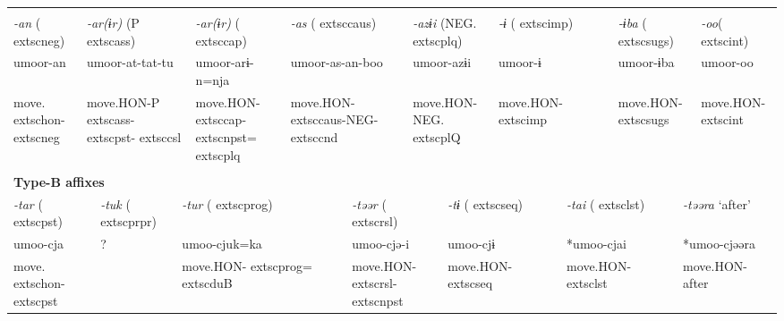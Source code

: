 \tabletail{}
\tablelasttail{}
\begin{tabularx}{\textwidth}{XXXXXXXXXXXXXXXXXXXX}
\lsptoprule
\multicolumn{20}{X}{{\bfseries Type-A affixes}}\\
\multicolumn{2}{X}{{ \textit{{}-an} (	extsc{neg})}} & \multicolumn{5}{X}{{ \textit{{}-ar(ɨr)} (P	extsc{ass})}} & \multicolumn{2}{X}{{ \textit{{}-ar(ɨr)} (	extsc{cap})}} & \multicolumn{3}{X}{{ \textit{{}-as} (	extsc{caus})}} & \multicolumn{3}{X}{{ \textit{{}-azɨi} (NEG.	extsc{plq})}} & \multicolumn{2}{X}{{ \textit{{}-ɨ} (	extsc{imp})}} & \multicolumn{2}{X}{{ \textit{{}-ɨba} (	extsc{sugs})}} & { \textit{{}-oo}(	extsc{int})}\\
\multicolumn{2}{X}{{ umoor-an}} & \multicolumn{5}{X}{{ umoor-at-tat-tu}} & \multicolumn{2}{X}{{ umoor-arɨ-n=nja}} & \multicolumn{3}{X}{{ umoor-as-an-boo}} & \multicolumn{3}{X}{{ umoor-azɨi}} & \multicolumn{2}{X}{{ umoor-ɨ}} & \multicolumn{2}{X}{{ umoor-ɨba}} & { umoor-oo}\\
\multicolumn{2}{X}{move.	extsc{hon}-	extsc{neg}} & \multicolumn{5}{X}{move.HON-P	extsc{ass}-	extsc{pst}-	extsc{csl}} & \multicolumn{2}{X}{move.HON-	extsc{cap}-	extsc{npst}=	extsc{plq}} & \multicolumn{3}{X}{move.HON-	extsc{caus}-NEG-	extsc{cnd}} & \multicolumn{3}{X}{move.HON-NEG.	extsc{pl}Q} & \multicolumn{2}{X}{move.HON-	extsc{imp}} & \multicolumn{2}{X}{move.HON-	extsc{sugs}} & move.HON-	extsc{int}\\
\multicolumn{20}{X}{}\\
\multicolumn{20}{X}{{\bfseries Type-B affixes}}\\
\multicolumn{3}{X}{{ \textit{{}-tar} (	extsc{pst})}} & \multicolumn{3}{X}{{ \textit{{}-tuk} (	extsc{prpr})}} & \multicolumn{5}{X}{{ \textit{{}-tur} (	extsc{prog})}} & \multicolumn{3}{X}{{ \textit{{}-təər} (	extsc{rsl})}} & \multicolumn{2}{X}{{ \textit{{}-tɨ} (	extsc{seq})}} & \multicolumn{2}{X}{{ \textit{{}-tai} (	extsc{lst})}} & \multicolumn{2}{X}{{ \textit{{}-təəra} ‘after’}}\\
\multicolumn{3}{X}{{ umoo-cja}} & \multicolumn{3}{X}{{ ?}} & \multicolumn{5}{X}{{ umoo-cjuk=ka}} & \multicolumn{3}{X}{{ umoo-cjə-i}} & \multicolumn{2}{X}{{ umoo-cjɨ}} & \multicolumn{2}{X}{{ *umoo-cjai}} & \multicolumn{2}{X}{{ *umoo-cjəəra}}\\
\multicolumn{3}{X}{move.	extsc{hon}-	extsc{pst}} & \multicolumn{3}{X}{} & \multicolumn{5}{X}{move.HON-	extsc{prog}=	extsc{du}B} & \multicolumn{3}{X}{move.HON-	extsc{rsl}-	extsc{npst}} & \multicolumn{2}{X}{move.HON-	extsc{seq}} & \multicolumn{2}{X}{move.HON-	extsc{lst}} & \multicolumn{2}{X}{{ move.HON-after}}\\

\end{tabularx}
